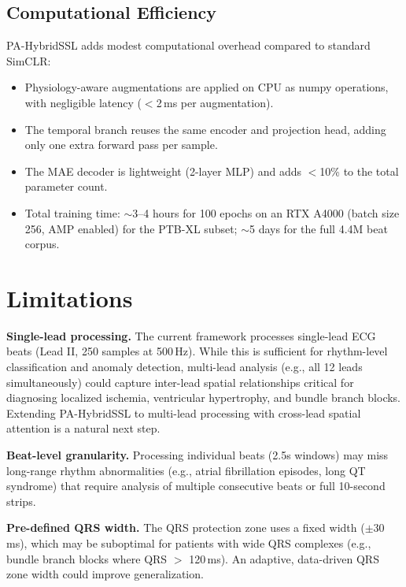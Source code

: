 \documentclass[journal,10pt]{IEEEtran}
\begin{document}
\subsection{Computational Efficiency}

PA-HybridSSL adds modest computational overhead compared to standard SimCLR:
\begin{itemize}
    \item Physiology-aware augmentations are applied on CPU as numpy operations, with negligible latency ($<$2\,ms per augmentation).
    \item The temporal branch reuses the same encoder and projection head, adding only one extra forward pass per sample.
    \item The MAE decoder is lightweight (2-layer MLP) and adds $<$10\% to the total parameter count.
    \item Total training time: $\sim$3--4 hours for 100 epochs on an RTX A4000 (batch size 256, AMP enabled) for the PTB-XL subset; $\sim$5 days for the full 4.4M beat corpus.
\end{itemize}



\section{Limitations}
\label{sec:limitations}

\noindent\textbf{Single-lead processing.} The current framework processes single-lead ECG beats (Lead II, 250 samples at 500\,Hz). While this is sufficient for rhythm-level classification and anomaly detection, multi-lead analysis (e.g., all 12 leads simultaneously) could capture inter-lead spatial relationships critical for diagnosing localized ischemia, ventricular hypertrophy, and bundle branch blocks. Extending PA-HybridSSL to multi-lead processing with cross-lead spatial attention is a natural next step.

\noindent\textbf{Beat-level granularity.} Processing individual beats (2.5s windows) may miss long-range rhythm abnormalities (e.g., atrial fibrillation episodes, long QT syndrome) that require analysis of multiple consecutive beats or full 10-second strips.

\noindent\textbf{Pre-defined QRS width.} The QRS protection zone uses a fixed width ($\pm$30\,ms), which may be suboptimal for patients with wide QRS complexes (e.g., bundle branch blocks where QRS $>$ 120\,ms). An adaptive, data-driven QRS zone width could improve generalization.
\end{document}
